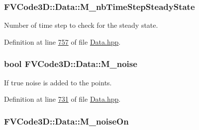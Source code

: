 \subsubsection[{\texorpdfstring{M\+\_\+nb\+Time\+Step\+Steady\+State}{M_nbTimeStepSteadyState}}]{ F\+V\+Code3\+D\+::\+Data\+::\+M\+\_\+nb\+Time\+Step\+Steady\+State\hspace{0.3cm}{\ttfamily [protected]}}\hypertarget{classFVCode3D_1_1Data_a89795eb2a12c28f1f919c3148c44556e}{}\label{classFVCode3D_1_1Data_a89795eb2a12c28f1f919c3148c44556e}


Number of time step to check for the steady state. 



Definition at line \hyperlink{Data_8hpp_source_l00757}{757} of file \hyperlink{Data_8hpp_source}{Data.\+hpp}.

\subsubsection[{\texorpdfstring{M\+\_\+noise}{M_noise}}]{\setlength{\rightskip}{0pt plus 5cm}bool F\+V\+Code3\+D\+::\+Data\+::\+M\+\_\+noise\hspace{0.3cm}{\ttfamily [protected]}}\hypertarget{classFVCode3D_1_1Data_a06f828cdc7dc1c3b4ea60b40f390333e}{}\label{classFVCode3D_1_1Data_a06f828cdc7dc1c3b4ea60b40f390333e}


If true noise is added to the points. 



Definition at line \hyperlink{Data_8hpp_source_l00731}{731} of file \hyperlink{Data_8hpp_source}{Data.\+hpp}.

\subsubsection[{\texorpdfstring{M\+\_\+noise\+On}{M_noiseOn}}]{ F\+V\+Code3\+D\+::\+Data\+::\+M\+\_\+noise\+On\hspace{0.3cm}{\ttfamily [protected]}}\hypertarget{classFVCode3D_1_1Data_a82362848d9cced52dc04f50aeb0c9323}{}\label{classFVCode3D_1_1Data_a82362848d9cced52dc04f50aeb0c9323}


